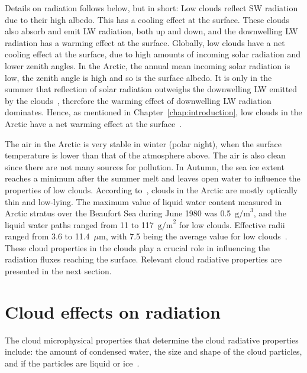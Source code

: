 Details on radiation follows below, but in short: Low clouds reflect SW radiation due to their high albedo. This has a cooling effect at the surface. These clouds also absorb and emit LW radiation, both up and down, and the downwelling LW radiation has a warming effect at the surface. Globally, low clouds have a net cooling effect at the surface, due to high amounts of incoming solar radiation and lower zenith angles. In the Arctic, the annual mean incoming solar radiation is low, the zenith angle is high and so is the surface albedo. It is only in the summer that reflection of solar radiation outweighs the downwelling LW emitted by the clouds~\citep{Curry1996}, therefore the warming effect of downwelling LW radiation dominates. Hence, as mentioned in Chapter~\ref{chap:introduction}, low clouds in the Arctic have a net warming effect at the surface~\citep{Shupe2004}.

The air in the Arctic is very stable in winter (polar night), when the surface temperature is lower than that of the atmosphere above. The air is also clean since there are not many sources for pollution. In Autumn, the sea ice extent reaches a minimum after the summer melt and leaves open water to influence the properties of low clouds. According to~\citet{Curry1996}, clouds in the Arctic are mostly optically thin and low-lying. The maximum value of liquid water content measured in Arctic stratus over the Beaufort Sea during June 1980 was 0.5~$\text{g/m}^3$, and the liquid water paths ranged from 11 to 117~$\text{g/m}^2$ for low clouds. Effective radii ranged from 3.6 to 11.4~$\mu\text{m}$, with 7.5 being the average value for low clouds~\citep{Curry1996}. These cloud properties in the clouds play a crucial role in influencing the radiation fluxes reaching the surface. Relevant cloud radiative properties are presented in the next section.

\section{Cloud effects on radiation}
The cloud microphysical properties that determine the cloud radiative properties include: the amount of condensed water, the size and shape of the cloud particles, and if the particles are liquid or ice~\citep{Curry1996}.

